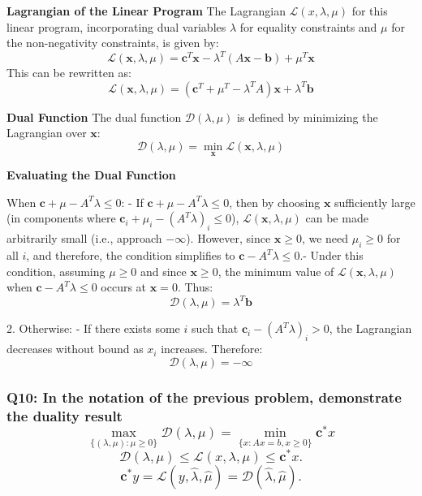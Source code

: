 \documentclass[8pt]{article}
\begin{document}
{\textbf{Lagrangian of the Linear Program}
The Lagrangian \(\mathcal{L}(x, \lambda, \mu)\) for this linear program, incorporating dual variables \(\lambda\) for equality constraints and \(\mu\) for the non-negativity constraints, is given by:
\[
\mathcal{L}(\mathbf{x}, \lambda, \mu) = \mathbf{c}^T \mathbf{x} - \lambda^T (A\mathbf{x} - \mathbf{b}) + \mu^T \mathbf{x}
\]
This can be rewritten as:
\[
\mathcal{L}(\mathbf{x}, \lambda, \mu) = (\mathbf{c}^T + \mu^T - \lambda^T A) \mathbf{x} + \lambda^T \mathbf{b}
\]

\textbf{Dual Function}
The dual function \(\mathcal{D}(\lambda, \mu)\) is defined by minimizing the Lagrangian over \(\mathbf{x}\):
\[
\mathcal{D}(\lambda, \mu) = \min_{\mathbf{x}} \mathcal{L}(\mathbf{x}, \lambda, \mu)
\]

\textbf{Evaluating the Dual Function}

When \(\mathbf{c} + \mu - A^T \lambda \leq 0\):
         - If \(\mathbf{c} + \mu - A^T \lambda \leq 0\), then by choosing \(\mathbf{x}\) sufficiently large (in components where \(\mathbf{c}_i + \mu_i  - (A^T \lambda)_i \leq 0\)), \(\mathcal{L}(\mathbf{x}, \lambda, \mu)\) can be made arbitrarily small (i.e., approach \(-\infty\)). However, since \(\mathbf{x} \geq 0\), we need \(\mu_i \geq 0\) for all \(i\), and therefore, the condition simplifies to \(\mathbf{c} - A^T \lambda \leq 0\).- Under this condition, assuming \(\mu \geq 0\) and since \(\mathbf{x} \geq 0\), the minimum value of \(\mathcal{L}(\mathbf{x}, \lambda, \mu)\) when \(\mathbf{c} - A^T \lambda \leq 0\) occurs at \(\mathbf{x} = 0\). Thus:
         \[\mathcal{D}(\lambda, \mu) = \lambda^T \mathbf{b} \]
    
2. Otherwise:
    - If there exists some \(i\) such that \(\mathbf{c}_i - (A^T \lambda)_i > 0\), the Lagrangian decreases without bound as \(x_i\) increases. Therefore:
    \[
    \mathcal{D}(\lambda, \mu) = -\infty
    \]

\subsubsection*{Q10: In the notation of the previous problem, demonstrate the duality result
\[
\max_{\{(\lambda, \mu) : \mu \geq 0\}} \mathcal{D}(\lambda, \mu) = \min_{\{x : A x = b, x \geq 0\}} \mathbf{c}^* x
\]
\[
\mathcal{D}(\lambda, \mu) \leq \mathcal{L}(x, \lambda, \mu) \leq \mathbf{c}^* x.
\]
\[
\mathbf{c}^* y = \mathcal{L}(y, \hat{\lambda}, \hat{\mu}) = \mathcal{D}(\hat{\lambda}, \hat{\mu}).
\]}

}
\end{document}
